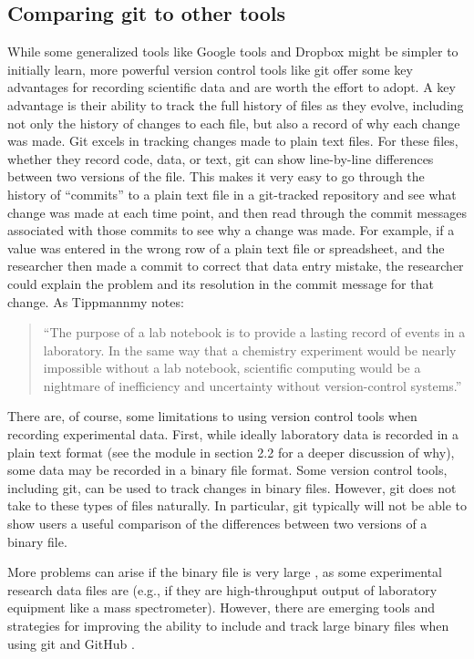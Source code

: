 \documentclass[]{tufte-book}
\begin{document}
\subsection{Comparing git to other tools}\label{comparing-git-to-other-tools}

While some generalized tools like Google tools and Dropbox might be simpler to
initially learn, more powerful version control tools like git offer some key
advantages for recording scientific data and are worth the effort to adopt. A
key advantage is their ability to track the full history of files as they
evolve, including not only the history of changes to each file, but also a
record of why each change was made. Git excels in tracking changes made to plain
text files. For these files, whether they record code, data, or text, git can
show line-by-line differences between two versions of the file. This makes it
very easy to go through the history of ``commits'' to a plain text file in a
git-tracked repository and see what change was made at each time point, and then
read through the commit messages associated with those commits to see why a
change was made. For example, if a value was entered in the wrong row of a plain
text file or spreadsheet, and the researcher then made a commit to correct that
data entry mistake, the researcher could explain the problem and its resolution
in the commit message for that change. As Tippmannmy notes:

\begin{quote}
``The purpose of a lab notebook is to provide a lasting record of events in a
laboratory. In the same way that a chemistry experiment would be nearly
impossible without a lab notebook, scientific computing would be a nightmare of
inefficiency and uncertainty without version-control systems.''
\citep{tippmannmy2014digital}
\end{quote}

There are, of course, some limitations to using version control tools when
recording experimental data. First, while ideally laboratory data is recorded in
a plain text format (see the module in section 2.2 for a deeper discussion of
why), some data may be recorded in a binary file format. Some version control
tools, including git, can be used to track changes in binary files. However, git
does not take to these types of files naturally. In particular, git typically
will not be able to show users a useful comparison of the differences between
two versions of a binary file.

More problems can arise if the binary file is
very large \citep{perez2016ten, blischak2016quick}, as some experimental research
data files are (e.g., if they are high-throughput output of laboratory equipment
like a mass spectrometer). However, there are emerging tools and strategies for
improving the ability to include and track large binary files when using git and
GitHub \citep{blischak2016quick}.
\end{document}
